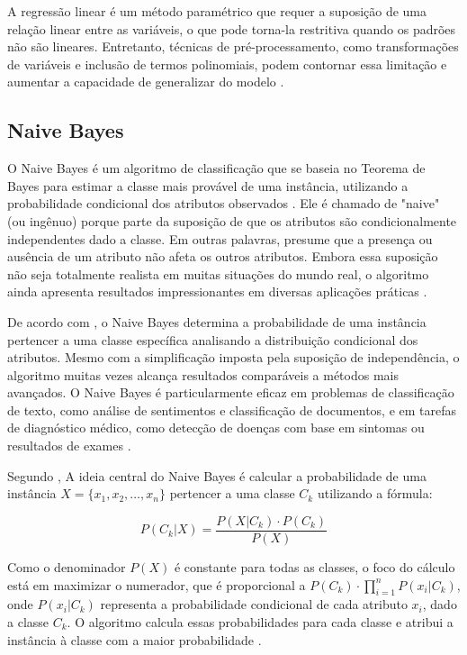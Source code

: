 A regressão linear é um método paramétrico que requer a suposição de uma relação linear entre as variáveis, o que pode torna-la restritiva quando os padrões não são lineares. Entretanto, técnicas de pré-processamento, como transformações de variáveis e inclusão de termos polinomiais, podem contornar essa limitação e aumentar a capacidade de generalizar do modelo \cite{montgomery2009}.

\subsection{Naive Bayes}

O Naive Bayes é um algoritmo de classificação que se baseia no Teorema de Bayes para estimar a classe mais provável de uma instância, utilizando a probabilidade condicional dos atributos observados \cite{rish2001}. Ele é chamado de "naive" (ou ingênuo) porque parte da suposição de que os atributos são condicionalmente independentes dado a classe. Em outras palavras, presume que a presença ou ausência de um atributo não afeta os outros atributos. Embora essa suposição não seja totalmente realista em muitas situações do mundo real, o algoritmo ainda apresenta resultados impressionantes em diversas aplicações práticas \cite{rish2001}.

De acordo com , o Naive Bayes determina a probabilidade de uma instância pertencer a uma classe específica analisando a distribuição condicional dos atributos. Mesmo com a simplificação imposta pela suposição de independência, o algoritmo muitas vezes alcança resultados comparáveis a métodos mais avançados. O Naive Bayes é particularmente eficaz em problemas de classificação de texto, como análise de sentimentos e classificação de documentos, e em tarefas de diagnóstico médico, como detecção de doenças com base em sintomas ou resultados de exames \cite{rish2001}.


Segundo , A ideia central do Naive Bayes é calcular a probabilidade de uma instância $X = \{x_1, x_2, \dots, x_n\}$ pertencer a uma classe $C_k$ utilizando a fórmula:

$$P(C_k|X) = \frac{P(X|C_k) \cdot P(C_k)}{P(X)}$$

Como o denominador $P(X)$ é constante para todas as classes, o foco do cálculo está em maximizar o numerador, que é proporcional a $P(C_k) \cdot \prod_{i=1}^{n} P(x_i | C_k)$, onde $P(x_i | C_k)$ representa a probabilidade condicional de cada atributo $x_i$, dado a classe $C_k$. O algoritmo calcula essas probabilidades para cada classe e atribui a instância à classe com a maior probabilidade \cite{zhang2004}. 


